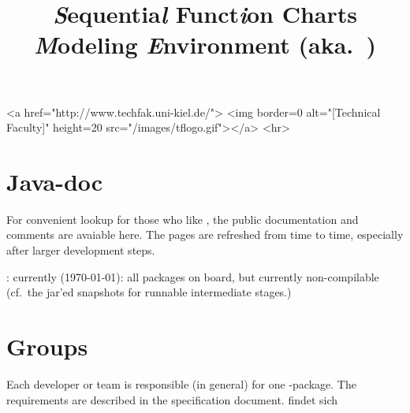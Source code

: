 \documentclass[11pt,german]{article}
\title{{\huge\bf \textsl{S}equentia\textsl{l} Funct\textsl{i}on Charts
    \textsl{M}odeling \textsl{E}nvironment (aka.\ \Slime)}}
\date{}
\begin{document}
\vspace{-2cm}



\begin{rawhtml}
<a href="http://www.techfak.uni-kiel.de/">
  <img border=0 alt="[Technical Faculty]" height=20  src="/images/tflogo.gif"></a>
<hr>
\end{rawhtml}


\maketitle{}






\section*{Java-doc}
\label{sec:javadoc}
\label{sec:html-doc}



For convenient lookup for those who like \javadoc, the public documentation
and comments are avaiable here. The pages are refreshed from time to time,
especially after larger development steps.

\begin{center}
  : currently (\today): all
  packages on board, but currently non-compilable (cf.\ the jar'ed
  snapshots for runnable intermediate stages.)
\end{center}

















\section*{Groups}
\label{sec:groups}

Each developer or team is responsible (in general) for one \Java-package.
The requirements are described in the specification document.  findet sich
\end{document}
